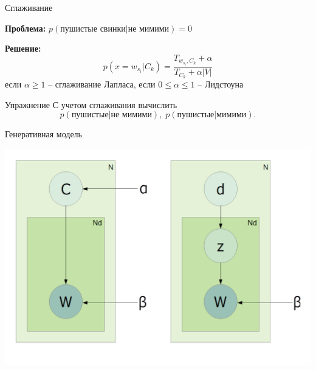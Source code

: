 \documentclass[10pt]{beamer}
\begin{document}

\begin{frame}{Сглаживание}

{\bf Проблема:} $p(\text{пушистые свинки}|\text{не мимими}) = 0$

\vspace{1em}
{\bf Решение:}
\[
p(x = w_{s_i} | C_k) = \frac{T_{w_{s_i}, C_k} + \alpha}{T_{C_k} + \alpha |V|}
\]
если $\alpha \geq 1$ -- сглаживание Лапласа, если $0 \leq \alpha \leq 1$ -- Лидстоуна

\vspace{1em}
\begin{exampleblock}{Упражнение}
С учетом сглаживания вычислить 
\[
p(\text{пушистые}|\text{не мимими}), \; p(\text{пушистые}|\text{мимими}).
\]
\end{exampleblock}

\end{frame}


\begin{frame}{Генеративная модель}

\begin{center}
\includegraphics[scale=0.3]{images/lsa.png}
\end{center}

\end{frame}

\end{document}
